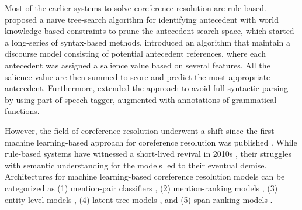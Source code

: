 \documentclass[11pt]{article}
\begin{document}
Most of the earlier systems to solve coreference resolution are rule-based. \parencite{hobbs1978} proposed a naïve tree-search algorithm for identifying antecedent with world knowledge based constraints to prune the antecedent search space, which started a long-series of syntax-based methods. \parencite{lappin1994} introduced an algorithm that maintain a discourse model consisting of potential antecedent references, where each antecedent was assigned a salience value based on several features. All the salience value are then summed to score and predict the most appropriate antecedent. Furthermore, \parencite{kennedy1996} extended the approach to avoid full syntactic parsing by using part-of-speech tagger, augmented with annotations of grammatical functions.

However, the field of coreference resolution underwent a shift since the first machine learning-based approach for coreference resolution was published \parencite{ConnollyEtAl:94}. While rule-based systems have witnessed a short-lived revival in 2010s \parencite{zhou2004, haghighi2009}, their struggles with semantic understanding for the models led to their eventual demise. Architectures for machine learning-based coreference resolution models can be categorized as (1) mention-pair classifiers \parencite{ng2002identifying,bengtson2008understanding}, (2) mention-ranking models \parencite{durrett2013easy,wiseman2015learning,clark2016deep,denis-baldridge-2008-specialized}, (3) entity-level models \parencite{haghighi-klein-2010-coreference,wiseman-etal-2016-learning,clark-manning-2015-entity,clark-manning-2016-improving}, (4) latent-tree models \parencite{fernandes-etal-2012-latent,martschat-strube-2015-latent,bjorkelund-kuhn-2014-learning}, and (5) span-ranking models \parencite{lee2017end,lee2018higher,joshi2019coref}.

\end{document}
